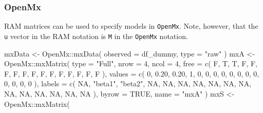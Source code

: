 \documentclass[
]{book}
\newenvironment{Shaded}{\begin{snugshade}}{\end{snugshade}}
\newcommand{\AttributeTok}[1]{\textcolor[rgb]{0.77,0.63,0.00}{#1}}
\newcommand{\ConstantTok}[1]{\textcolor[rgb]{0.00,0.00,0.00}{#1}}
\newcommand{\DecValTok}[1]{\textcolor[rgb]{0.00,0.00,0.81}{#1}}
\newcommand{\FloatTok}[1]{\textcolor[rgb]{0.00,0.00,0.81}{#1}}
\newcommand{\FunctionTok}[1]{\textcolor[rgb]{0.00,0.00,0.00}{#1}}
\newcommand{\NormalTok}[1]{#1}
\newcommand{\OtherTok}[1]{\textcolor[rgb]{0.56,0.35,0.01}{#1}}
\newcommand{\SpecialCharTok}[1]{\textcolor[rgb]{0.00,0.00,0.00}{#1}}
\newcommand{\StringTok}[1]{\textcolor[rgb]{0.31,0.60,0.02}{#1}}
\theoremstyle{definition}
\theoremstyle{definition}
\theoremstyle{definition}
\theoremstyle{remark}
\begin{document}
\hypertarget{openmx-openmx2020-1}{%
\subsubsection{\texorpdfstring{OpenMx \citep{OpenMx2020}}{OpenMx {[}@OpenMx2020{]}}}\label{openmx-openmx2020-1}}

RAM matrices can be used to specify models in \texttt{OpenMx}.
Note, however, that the \texttt{u} vector in the RAM notation is
\texttt{M} in the \texttt{OpenMx} notation.

\begin{Shaded}
\begin{Highlighting}[]
\NormalTok{mxData }\OtherTok{\textless{}{-}}\NormalTok{ OpenMx}\SpecialCharTok{::}\FunctionTok{mxData}\NormalTok{(}
  \AttributeTok{observed =}\NormalTok{ df\_dummy,}
  \AttributeTok{type =} \StringTok{"raw"}
\NormalTok{)}
\NormalTok{mxA }\OtherTok{\textless{}{-}}\NormalTok{ OpenMx}\SpecialCharTok{::}\FunctionTok{mxMatrix}\NormalTok{(}
  \AttributeTok{type =} \StringTok{"Full"}\NormalTok{,}
  \AttributeTok{nrow =} \DecValTok{4}\NormalTok{,}
  \AttributeTok{ncol =} \DecValTok{4}\NormalTok{,}
  \AttributeTok{free =} \FunctionTok{c}\NormalTok{(}
\NormalTok{    F, T, T, F,}
\NormalTok{    F, F, F, F,}
\NormalTok{    F, F, F, F,}
\NormalTok{    F, F, F, F}
\NormalTok{  ),}
  \AttributeTok{values =} \FunctionTok{c}\NormalTok{(}
    \DecValTok{0}\NormalTok{, }\FloatTok{0.20}\NormalTok{, }\FloatTok{0.20}\NormalTok{, }\DecValTok{1}\NormalTok{,}
    \DecValTok{0}\NormalTok{, }\DecValTok{0}\NormalTok{, }\DecValTok{0}\NormalTok{, }\DecValTok{0}\NormalTok{,}
    \DecValTok{0}\NormalTok{, }\DecValTok{0}\NormalTok{, }\DecValTok{0}\NormalTok{, }\DecValTok{0}\NormalTok{,}
    \DecValTok{0}\NormalTok{, }\DecValTok{0}\NormalTok{, }\DecValTok{0}\NormalTok{, }\DecValTok{0}
\NormalTok{  ),}
  \AttributeTok{labels =} \FunctionTok{c}\NormalTok{(}
    \ConstantTok{NA}\NormalTok{, }\StringTok{"beta1"}\NormalTok{, }\StringTok{"beta2"}\NormalTok{, }\ConstantTok{NA}\NormalTok{,}
    \ConstantTok{NA}\NormalTok{, }\ConstantTok{NA}\NormalTok{, }\ConstantTok{NA}\NormalTok{, }\ConstantTok{NA}\NormalTok{,}
    \ConstantTok{NA}\NormalTok{, }\ConstantTok{NA}\NormalTok{, }\ConstantTok{NA}\NormalTok{, }\ConstantTok{NA}\NormalTok{,}
    \ConstantTok{NA}\NormalTok{, }\ConstantTok{NA}\NormalTok{, }\ConstantTok{NA}\NormalTok{, }\ConstantTok{NA}
\NormalTok{  ),}
  \AttributeTok{byrow =} \ConstantTok{TRUE}\NormalTok{,}
  \AttributeTok{name =} \StringTok{"mxA"}
\NormalTok{)}
\NormalTok{mxS }\OtherTok{\textless{}{-}}\NormalTok{ OpenMx}\SpecialCharTok{::}\FunctionTok{mxMatrix}\NormalTok{(}

\end{Highlighting}
\end{Shaded}
\end{document}
